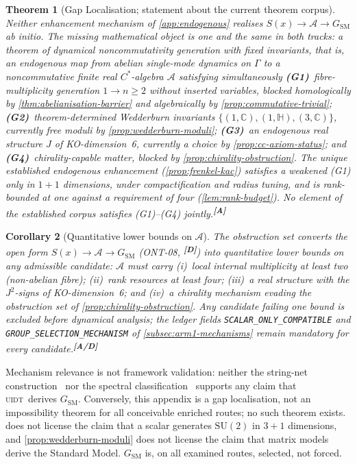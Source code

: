 \documentclass[12pt,a4paper,twoside]{article}
\theoremstyle{plain}
\newtheorem{theorem}{Theorem}[section]
\newtheorem{corollary}[theorem]{Corollary}
\theoremstyle{definition}
\theoremstyle{remark}
\newcommand{\UIDT}{\textsc{uidt}}
\newcommand{\catmark}[1]{\textsuperscript{\textsf{\textbf{[#1]}}}}
\begin{document}
\begin{theorem}[Gap Localisation; statement about the current theorem corpus]
\label{thm:gap-localisation}
Neither enhancement mechanism of \cref{app:endogenous} realises
$S(x)\to\mathcal{A}\to G_{\mathrm{SM}}$ ab initio. The missing
mathematical object is one and the same in both tracks: a theorem of
\emph{dynamical noncommutativity generation with fixed invariants}, that
is, an endogenous map from abelian single-mode dynamics on $\Gamma$ to a
noncommutative finite real $C^{*}$-algebra $\mathcal{A}$ satisfying
simultaneously
\textbf{(G1)}~fibre-multiplicity generation $1\to n\ge 2$ without inserted
variables, blocked homologically by \cref{thm:abelianisation-barrier} and
algebraically by \cref{prop:commutative-trivial};
\textbf{(G2)}~theorem-determined Wedderburn invariants
$\{(1,\mathbb{C}),(1,\mathbb{H}),(3,\mathbb{C})\}$, currently free moduli
by \cref{prop:wedderburn-moduli};
\textbf{(G3)}~an endogenous real structure $J$ of KO-dimension~6,
currently a choice by \cref{prop:cc-axiom-status}; and
\textbf{(G4)}~chirality-capable matter, blocked by
\cref{prop:chirality-obstruction}. The unique established endogenous
enhancement (\cref{prop:frenkel-kac}) satisfies a weakened (G1) only in
$1{+}1$ dimensions, under compactification and radius tuning, and is
rank-bounded at one against a requirement of four
(\cref{lem:rank-budget}). No element of the established corpus satisfies
(G1)--(G4) jointly.\catmark{A}
\end{theorem}

\begin{corollary}[Quantitative lower bounds on $\mathcal{A}$]
\label{cor:algebra-lower-bounds}
The obstruction set converts the open form
$S(x)\to\mathcal{A}\to G_{\mathrm{SM}}$ (ONT-08, \catmark{D}) into
quantitative lower bounds on any admissible candidate: $\mathcal{A}$ must
carry (i)~local internal multiplicity at least two (non-abelian fibre);
(ii)~rank resources at least four; (iii)~a real structure with the
$J^2$-signs of KO-dimension~6; and (iv)~a chirality mechanism evading the
obstruction set of \cref{prop:chirality-obstruction}. Any candidate
failing one bound is excluded before dynamical analysis; the ledger fields
\texttt{SCALAR\_ONLY\_COMPATIBLE} and \texttt{GROUP\_SELECTION\_MECHANISM}
of \cref{subsec:arm1-mechanisms} remain mandatory for every
candidate.\catmark{A/D}
\end{corollary}

\begin{governancebox}
Mechanism relevance is not framework validation: neither the string-net
construction~\cite{levinwen2005} nor the spectral
classification~\cite{cc2008} supports any claim that \UIDT\ derives
$G_{\mathrm{SM}}$. Conversely, this appendix is a gap localisation, not an
impossibility theorem for all conceivable enriched routes; no such theorem
exists.  does not license the claim that a scalar
generates $\mathrm{SU}(2)$ in $3{+}1$ dimensions, and
\cref{prop:wedderburn-moduli} does not license the claim that matrix
models derive the Standard Model. $G_{\mathrm{SM}}$ is, on all examined
routes, selected, not forced.
\end{governancebox}
\end{document}
